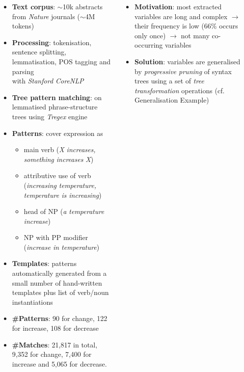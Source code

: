 \documentclass[24pt, a0papper, portrait]{tikzposter}
\newcommand{\point}[1]{\textbf{\textcolor{colorThree}{#1}}:}
\begin{document}
\begin{columns}
{  
\begin{itemize}
\item \point{Text corpus} $\sim$10k abstracts from \emph{Nature} journals ($\sim$4M tokens)
\item \point{Processing} tokenisation, sentence splitting, lemmatisation, POS tagging and parsing\\with \emph{Stanford CoreNLP}
\item \point{Tree pattern matching} on lemmatised phrase-structure trees using \emph{Tregex} engine
\item \point{Patterns} cover expression as 
\begin{itemize}
\item main verb (\emph{X increases, something increases X})
\item attributive use of verb (\emph{increasing temperature, temperature is increasing})
\item head of NP (\emph{a temperature increase})
\item NP with PP modifier (\emph{increase in temperature})
\end{itemize}
\item \point{Templates} patterns automatically generated from a small number of hand-written templates plus list of verb/noun instantiations 
\item \point{\#Patterns} 90 for change, 122 for increase, 108 for decrease 
\item \point{\#Matches} 21,817 in total, 9,352 for change, 7,400 for increase and 5,065 for decrease.
\end{itemize}   
}
    
     

{  
\begin{itemize}

\item \point{Motivation} most extracted variables are long and complex 
$\rightarrow$ their frequency is low (66\% occurs only once) 
$\rightarrow$ not many co-occurring variables

\item \point{Solution} variables are generalised by \emph{progressive pruning} of syntax trees using a set of \emph{tree transformation} operations (cf. Generalisation Example)


\end{itemize}}
\end{columns}
\end{document}

